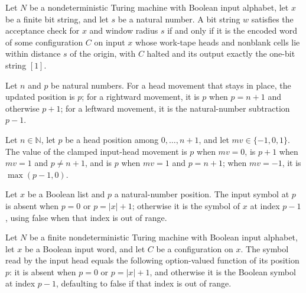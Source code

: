 \begin{theorem}
\label{Complexity.Codec.acceptChk_iff}
\leanok
{}
Let $N$ be a nondeterministic Turing machine with Boolean input alphabet, let $x$ be a
finite bit string, and let $s$ be a natural number. A bit string $w$ satisfies the
acceptance check for $x$ and window radius $s$ if and only if it is the encoded word of
some configuration $C$ on input $x$ whose work-tape heads and nonblank cells lie within
distance $s$ of the origin, with $C$ halted and its output exactly the one-bit string
$[1]$.
\end{theorem}

\begin{definition}
\label{Complexity.Codec.movePos}
\leanok
Let $n$ and $p$ be natural numbers. For a head movement that stays in place, the updated
position is $p$; for a rightward movement, it is $p$ when $p=n+1$ and otherwise $p+1$;
for a leftward movement, it is the natural-number subtraction $p-1$.
\end{definition}

\begin{lemma}
\label{Complexity.Codec.val_moveInputPos}
\leanok
{}
Let $n\in\mathbb N$, let $p$ be a head position among $0,\ldots,n+1$, and let
$mv\in\{-1,0,1\}$. The value of the clamped input-head movement is $p$ when $mv=0$, is
$p+1$ when $mv=1$ and $p\ne n+1$, and is $p$ when $mv=1$ and $p=n+1$; when $mv=-1$, it
is $\max(p-1,0)$.
\end{lemma}

\begin{definition}
\label{Complexity.Codec.inpOf}
\leanok
Let $x$ be a Boolean list and $p$ a natural-number position. The input symbol at $p$ is
absent when $p=0$ or $p=|x|+1$; otherwise it is the symbol of $x$ at index $p-1$, using
false when that index is out of range.
\end{definition}

\begin{lemma}
\label{Complexity.Codec.inputSymbol_eq}
\leanok
{}
Let $N$ be a finite nondeterministic Turing machine with Boolean input alphabet, let $x$
be a Boolean input word, and let $C$ be a configuration on $x$. The symbol read by the
input head equals the following option-valued function of its position $p$: it is absent
when $p=0$ or $p=|x|+1$, and otherwise it is the Boolean symbol at index $p-1$,
defaulting to false if that index is out of range.
\end{lemma}


